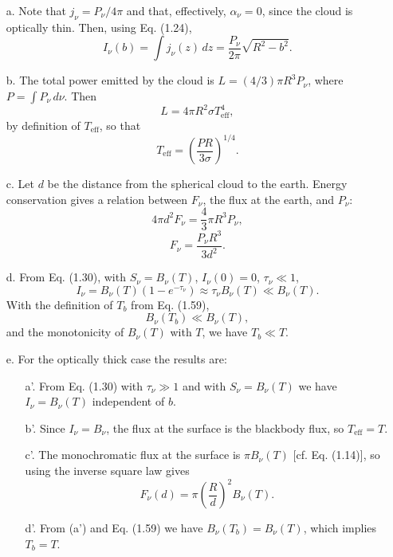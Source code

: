 \documentclass[12pt]{article}
\begin{document}
\begin{enumerate}
    \item[a.] Note that \( j_\nu = P_\nu / 4 \pi \) and that, effectively, \( \alpha_\nu = 0 \), since the cloud is optically thin. Then, using Eq. (1.24),
          \[
              I_\nu(b) = \int j_\nu(z) \, dz = \frac{P_\nu}{2\pi} \sqrt{R^2 - b^2}.
          \]

    \item[b.] The total power emitted by the cloud is \( L = (4/3) \pi R^3 P_\nu \), where \( P = \int P_\nu \, d\nu \). Then
          \[
              L = 4 \pi R^2 \sigma T_{\text{eff}}^4,
          \]
          by definition of \( T_{\text{eff}} \), so that
          \[
              T_{\text{eff}} = \left( \frac{P R}{3 \sigma} \right)^{1/4}.
          \]

    \item[c.] Let \( d \) be the distance from the spherical cloud to the earth. Energy conservation gives a relation between \( F_\nu \), the flux at the earth, and \( P_\nu \):
          \[
              4 \pi d^2 F_\nu = \frac{4}{3} \pi R^3 P_\nu,
          \]
          \[
              F_\nu = \frac{P_\nu R^3}{3 d^2}.
          \]
    \item[d.] From Eq. (1.30), with \( S_\nu = B_\nu(T) \), \( I_\nu(0) = 0 \), \( \tau_\nu \ll 1 \),
          \[
              I_\nu = B_\nu(T)(1 - e^{-\tau_\nu}) \approx \tau_\nu B_\nu(T) \ll B_\nu(T).
          \]
          With the definition of \( T_b \) from Eq. (1.59),
          \[
              B_\nu(T_b) \ll B_\nu(T),
          \]
          and the monotonicity of \( B_\nu(T) \) with \( T \), we have \( T_b \ll T \).
    \item[e.] For the optically thick case the results are:
          \begin{enumerate}
              \item[a'.] From Eq. (1.30) with \( \tau_\nu \gg 1 \) and with \( S_\nu = B_\nu(T) \) we have \( I_\nu = B_\nu(T) \) independent of \( b \).
              \item[b'.] Since \( I_\nu = B_\nu \), the flux at the surface is the blackbody flux, so \( T_{\text{eff}} = T \).
              \item[c'.] The monochromatic flux at the surface is \( \pi B_\nu(T) \) [cf. Eq. (1.14)], so using the inverse square law gives
                    \[
                        F_\nu(d) = \pi \left( \frac{R}{d} \right)^2 B_\nu(T).
                    \]
              \item[d'.] From (a') and Eq. (1.59) we have \( B_\nu(T_b) = B_\nu(T) \), which implies \( T_b = T \).
          \end{enumerate}
\end{enumerate}
\end{document}
